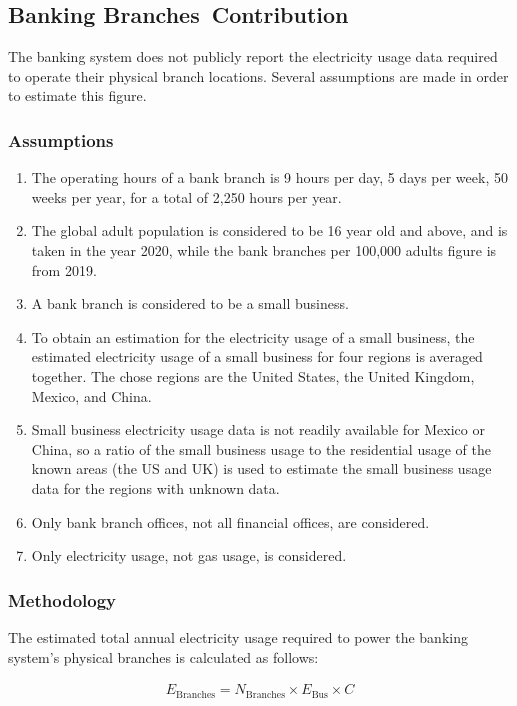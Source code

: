 \subsection{Banking Branches Contribution}\label{section:banks-branches}
The banking system does not publicly report the electricity usage data required to operate their physical branch locations.
Several assumptions are made in order to estimate this figure.

\subsubsection{Assumptions}
\begin{enumerate}
  \item The operating hours of a bank branch is 9 hours per day, 5 days per week, 50 weeks per year, for a total of 2,250 hours per year.
  \item The global adult population is considered to be 16 year old and above, and is taken in the year 2020, while the bank branches per 100,000 adults figure is from 2019.
  \item A bank branch is considered to be a small business.
  \item To obtain an estimation for the electricity usage of a small business, the estimated electricity usage of a small business for four regions is averaged together. The chose regions are the United States, the United Kingdom, Mexico, and China.
  \item Small business electricity usage data is not readily available for Mexico or China, so a ratio of the small business usage to the residential usage of the known areas (the US and UK) is used to estimate the small business usage data for the regions with unknown data.
  \item Only bank branch offices, not all financial offices, are considered.
  \item Only electricity usage, not gas usage, is considered.
\end{enumerate}

\subsubsection{Methodology}
The estimated total annual electricity usage required to power the banking system's physical branches is calculated as follows:

\begin{align}\label{eqn:banks-e-branches}
  E_\textrm{Branches} = N_\textrm{Branches} \times E_\textrm{Bus} \times C
\end{align}

